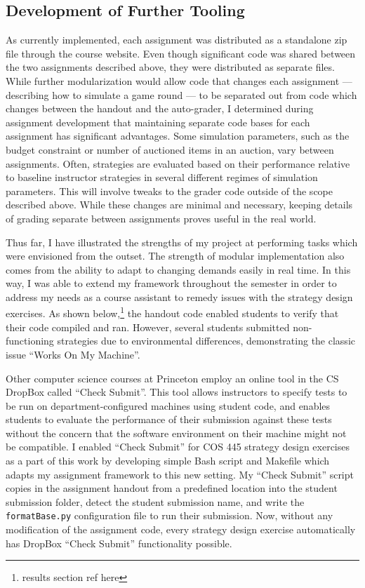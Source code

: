 \documentclass[pageno]{jpaper}
\begin{document}
\subsection*{Development of Further Tooling}
As currently implemented, each assignment was distributed as a standalone zip file through the course website.
Even though significant code was shared between the two assignments described above, they were distributed as separate files.
While further modularization would allow code that changes each assignment --- describing how to simulate a game round --- to be separated out from code which changes between the handout and the auto-grader, I determined during assignment development that maintaining separate code bases for each assignment has significant advantages.
Some simulation parameters, such as the budget constraint or number of auctioned items in an auction, vary between assignments.
Often, strategies are evaluated based on their performance relative to baseline instructor strategies in several different regimes of simulation parameters.
This will involve tweaks to the grader code outside of the scope described above.
While these changes are minimal and necessary, keeping details of grading separate between assignments proves useful in the real world.

Thus far, I have illustrated the strengths of my project at performing tasks which were envisioned from the outset.
The strength of modular implementation also comes from the ability to adapt to changing demands easily in real time.
In this way, I was able to extend my framework throughout the semester in order to address my needs as a course assistant to remedy issues with the strategy design exercises.
As shown below,\footnote{results section ref here} the handout code enabled students to verify that their code compiled and ran.
However, several students submitted non-functioning strategies due to environmental differences, demonstrating the classic issue ``Works On My Machine''.

Other computer science courses at Princeton employ an online tool in the CS DropBox called ``Check Submit''.
This tool allows instructors to specify tests to be run on department-configured machines using student code, and enables students to evaluate the performance of their submission against these tests without the concern that the software environment on their machine might not be compatible.
I enabled ``Check Submit'' for COS 445 strategy design exercises as a part of this work by developing simple Bash script and Makefile which adapts my assignment framework to this new setting.
My ``Check Submit'' script copies in the assignment handout from a predefined location into the student submission folder, detect the student submission name, and write the \texttt{formatBase.py} configuration file to run their submission.
Now, without any modification of the assignment code, every strategy design exercise automatically has DropBox ``Check Submit'' functionality possible.
\end{document}

